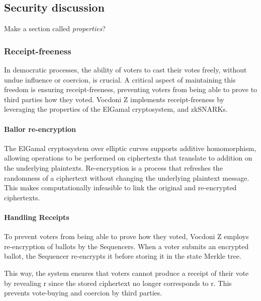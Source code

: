 


\subsection{Security discussion}
\label{sec:analysis:security}

Make a section called \textit{properties}?

\subsubsection{Receipt-freeness}

In democratic processes, the ability of voters to cast their votes freely, without undue influence or coercion, is crucial. A critical aspect of maintaining this freedom is ensuring receipt-freeness, preventing voters from being able to prove to third parties how they voted. Vocdoni Z implements receipt-freeness by leveraging the properties of the ElGamal cryptosystem, and zkSNARKs.

\paragraph{Ballor re-encryption}

The ElGamal cryptosystem over elliptic curves supports additive homomorphism, allowing operations to be performed on ciphertexts that translate to addition on the underlying plaintexts. Re-encryption is a process that refreshes the randomness of a ciphertext without changing the underlying plaintext message. This makes computationally infeasible to link the original and re-encrypted ciphertexts.

\paragraph{Handling Receipts}

To prevent voters from being able to prove how they voted, Vocdoni Z employs re-encryption of ballots by the Sequencers. When a voter submits an encrypted ballot, the Sequencer re-encrypts it before storing it in the state Merkle tree.

This way, the system ensures that voters cannot produce a receipt of their vote by revealing r since the stored ciphertext no longer corresponds to r. This prevents vote-buying and coercion by third parties.

